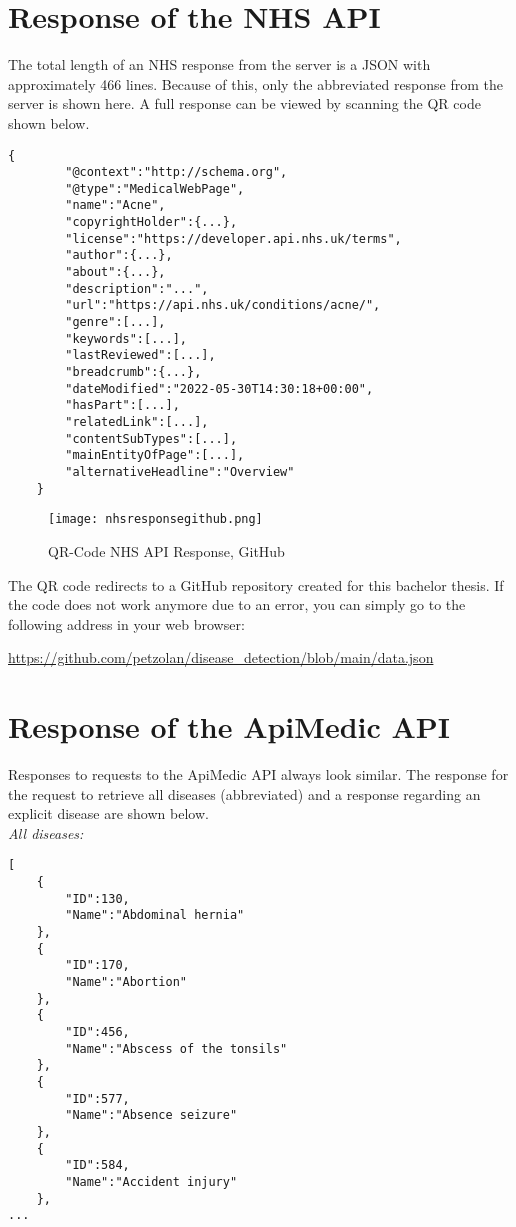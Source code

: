 \tocless\section{Response of the NHS API}
The total length of an NHS response from the server is a JSON with approximately 466 lines. Because of this, only the abbreviated response from the server is shown here. A full response can be viewed by scanning the QR code shown below. 
\begin{lstlisting}[caption={Abbreviated Response of NHS API}]
	{
		"@context":"http://schema.org",
		"@type":"MedicalWebPage",
		"name":"Acne",
		"copyrightHolder":{...},
		"license":"https://developer.api.nhs.uk/terms",
		"author":{...},
		"about":{...},
		"description":"...",
		"url":"https://api.nhs.uk/conditions/acne/",
		"genre":[...],
		"keywords":[...],
		"lastReviewed":[...],
		"breadcrumb":{...},
		"dateModified":"2022-05-30T14:30:18+00:00",
		"hasPart":[...],
		"relatedLink":[...],
		"contentSubTypes":[...],
		"mainEntityOfPage":[...],
		"alternativeHeadline":"Overview"
	}
\end{lstlisting}
\begin{figure}[H]
	\centering
	\texttt{[image: nhsresponsegithub.png]}
	\caption{QR-Code NHS API Response, GitHub}
\end{figure}
The QR code redirects to a GitHub repository created for this bachelor thesis. If the code does not work anymore due to an error, you can simply go to the following address in your web browser:
\begin{center}
	\url{https://github.com/petzolan/disease_detection/blob/main/data.json}
\end{center}
\pagebreak
\tocless\section{Response of the ApiMedic API}
Responses to requests to the ApiMedic API always look similar. The response for the request to retrieve all diseases (abbreviated) and a response regarding an explicit disease are shown below.
\newline \\
\textit{All diseases:} 

\begin{lstlisting}[basicstyle=\tiny, caption={Abbreviated Reponse of all Diseases ApiMedic API}]
[
	{
		"ID":130,
		"Name":"Abdominal hernia"
	},
	{
		"ID":170,
		"Name":"Abortion"
	},
	{
		"ID":456,
		"Name":"Abscess of the tonsils"
	},
	{
		"ID":577,
		"Name":"Absence seizure"
	},
	{
		"ID":584,
		"Name":"Accident injury"
	},
...
\end{lstlisting}

